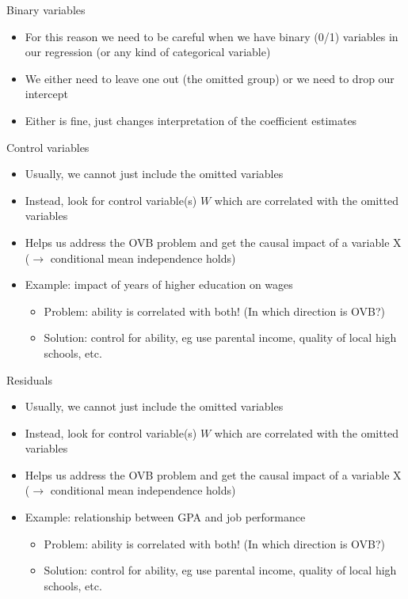 \documentclass[aspectratio=169]{beamer}
\begin{document}
\begin{frame}{Binary variables}
    \begin{itemize}
        \item For this reason we need to be careful when we have binary (0/1) variables in our regression (or any kind of categorical variable)
        \item We either need to leave one out (the omitted group) or we need to drop our intercept
        \item Either is fine, just changes interpretation of the coefficient estimates
    \end{itemize}
\end{frame}

\begin{frame}{Control variables}
    \begin{itemize}
        \item Usually, we cannot just include the omitted variables
        \item Instead, look for control variable(s) $W$ which are correlated with the omitted variables
        \item Helps us address the OVB problem and get the causal impact of a variable X ($\to$ conditional mean independence holds)
        \item Example: impact of years of higher education on wages
        \begin{itemize}
            \item Problem: ability is correlated with both! (In which direction is OVB?)
            \item Solution: control for ability, eg use parental income, quality of local high schools, etc.
        \end{itemize}
    \end{itemize}
\end{frame}

\begin{frame}{Residuals}
    \begin{itemize}
        \item Usually, we cannot just include the omitted variables
        \item Instead, look for control variable(s) $W$ which are correlated with the omitted variables
        \item Helps us address the OVB problem and get the causal impact of a variable X ($\to$ conditional mean independence holds)
        \item Example: relationship between GPA and job performance
        \begin{itemize}
            \item Problem: ability is correlated with both! (In which direction is OVB?)
            \item Solution: control for ability, eg use parental income, quality of local high schools, etc.
        \end{itemize}
    \end{itemize}
\end{frame}
\end{document}
